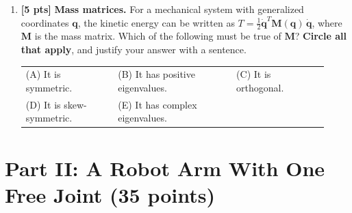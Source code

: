 \documentclass[11pt,letterpaper]{article}
\newcommand{\answerspace}[1]{\par\vspace{#1}}
\newcommand{\pts}[1]{\textbf{[#1 pts]}}
\begin{document}
\begin{enumerate}[label=\textbf{I.\arabic*}, leftmargin=*, itemsep=1em]
\smallskip
\begin{enumerate}[label=(\Alph*), nosep, leftmargin=2.2em]
    \item If all of the $\lambda_i$ are real, then $\mathbf{x}^*$ is stable.
    \item If $\operatorname{Re}(\lambda_i) < 0$ for all $i$, then $\mathbf{x}^*$ is asymptotically stable.
    \item If $\operatorname{Re}(\lambda_i) > 0$ for any $i$, then $\mathbf{x}^*$ is unstable.
    \item If all of the $\lambda_i$ are purely imaginary, then $\mathbf{x}^*$ is stable.
    \item If $\lvert\lambda_i\rvert < 1$ for all $i$, then $\mathbf{x}^*$ is stable.
\end{enumerate}
\answerspace{2.4in}

\item \pts{5} \textbf{Mass matrices.} For a mechanical system with generalized coordinates $\mathbf{q}$, the kinetic energy can be written as $T = \tfrac12\dot{\mathbf{q}}^T\mathbf{M}(\mathbf{q})\,\dot{\mathbf{q}}$, where $\mathbf{M}$ is the mass matrix. Which of the following must be true of $\mathbf{M}$? \textbf{Circle all that apply}, and justify your answer with a sentence.

\smallskip
\begin{tabular}{@{}p{0.28\linewidth}p{0.36\linewidth}p{0.28\linewidth}@{}}
(A) It is symmetric. & (B) It has positive eigenvalues. & (C) It is orthogonal. \\[2pt]
(D) It is skew-symmetric. & (E) It has complex eigenvalues. &
\end{tabular}
\answerspace{2.2in}

\end{enumerate}

\newpage
\section*{Part II: A Robot Arm With One Free Joint \hfill (35 points)}
\end{document}
